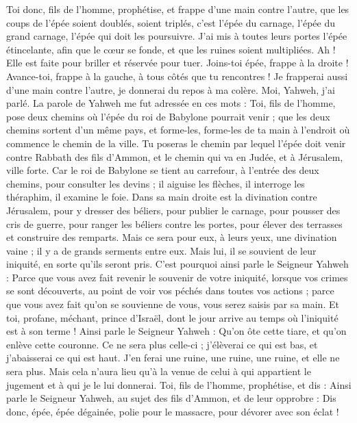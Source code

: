 \begin{multicols}{2}
Toi donc, fils de l’homme, prophétise, et frappe d'une main contre l'autre, que les coups de l'épée soient doublés, soient triplés, c’est l’épée du carnage, l’épée du grand carnage, l’épée qui doit les poursuivre.
J'ai mis à toutes leurs portes l'épée étincelante, afin que le cœur se fonde, et que les ruines soient multipliées. Ah ! Elle est faite pour briller et réservée pour tuer.
Joins-toi épée, frappe à la droite ! Avance-toi, frappe à la gauche, à tous côtés que tu rencontres !
Je frapperai aussi d'une main contre l'autre, je donnerai du repos à ma colère. Moi, Yahweh, j'ai parlé.
La parole de Yahweh me fut adressée en ces mots :
Toi, fils de l’homme, pose deux chemins où l'épée du roi de Babylone pourrait venir ; que les deux chemins sortent d'un même pays, et forme-les, forme-les de ta main à l'endroit où commence le chemin de la ville.
Tu poseras le chemin par lequel l'épée doit venir contre Rabbath des fils d’Ammon, et le chemin qui va en Judée, et à Jérusalem, ville forte.
Car le roi de Babylone se tient au carrefour, à l’entrée des deux chemins, pour consulter les devins ; il aiguise les flèches, il interroge les théraphim, il examine le foie.
Dans sa main droite est la divination contre Jérusalem, pour y dresser des béliers, pour publier le carnage, pour pousser des cris de guerre, pour ranger les béliers contre les portes, pour élever des terrasses et construire des remparts.
Mais ce sera pour eux, à leurs yeux, une divination vaine ; il y a de grands serments entre eux. Mais lui, il se souvient de leur iniquité, en sorte qu’ils seront pris.
C'est pourquoi ainsi parle le Seigneur Yahweh : Parce que vous avez fait revenir le souvenir de votre iniquité, lorsque vos crimes se sont découverts, au point de voir vos péchés dans toutes vos actions ; parce que vous avez fait qu'on se souvienne de vous, vous serez saisis par sa main.
Et toi, profane, méchant, prince d'Israël, dont le jour arrive au temps où l’iniquité est à son terme !
Ainsi parle le Seigneur Yahweh : Qu'on ôte cette tiare, et qu'on enlève cette couronne. Ce ne sera plus celle-ci ; j'élèverai ce qui est bas, et j'abaisserai ce qui est haut\FTNT{}.
J’en ferai une ruine, une ruine, une ruine, et elle ne sera plus. Mais cela n’aura lieu qu’à la venue de celui à qui appartient le jugement et à qui je le lui donnerai.
Toi, fils de l’homme, prophétise, et dis : Ainsi parle le Seigneur Yahweh, au sujet des fils d’Ammon, et de leur opprobre : Dis donc, épée, épée dégainée, polie pour le massacre, pour dévorer avec son éclat !

\end{multicols}
